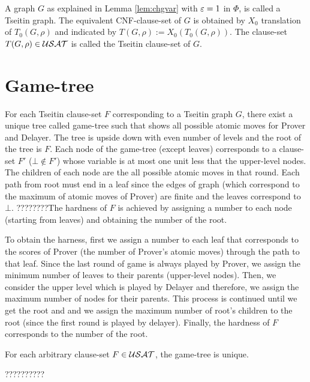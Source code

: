 \documentclass{report}
\begin{document}
A graph $G$ as explained in Lemma \ref{lem:chgvar} with $\varepsilon=1$ in $\Phi$, is called a Tseitin graph. The equivalent CNF-clause-set of $G$ is obtained by $X_0$ translation of $T_0(G,\rho)$ and indicated by $T(G,\rho) := X_0(T_0(G,\rho))$. The clause-set $T(G,\rho) \in \mathcal{USAT}$ is called the Tseitin clause-set of $G$.
\section{Game-tree}
\label{sec:Game-tree}

For each Tseitin clause-set $F$ corresponding to a Tseitin graph $G$, there exist a unique tree called game-tree such that shows all possible atomic moves for Prover and Delayer. The tree is upside down with even number of levels and the root of the tree is $F$. Each node of the game-tree (except leaves) corresponds to a clause-set $F'$ ($ \bot \not \in F'$) whose variable is at most one unit less that the upper-level nodes. The children of each node are the all possible atomic moves in that round. Each path from root must end in a leaf since the edges of graph (which correspond to the maximum of atomic moves of Prover) are finite and the leaves correspond to $\bot$. ????????The hardness of $F$ is achieved by assigning a number to each node (starting from leaves) and obtaining the number of the root.

To obtain the harness, first we assign a number to each leaf that corresponds to the scores of Prover (the number of Prover's atomic moves) through the path to that leaf. Since the last round of game is always played by Prover, we assign the minimum number of leaves to their parents (upper-level nodes). Then, we consider the upper level which is played by Delayer and therefore, we assign the maximum number of nodes for their parents. This process is continued until we get the root and and we assign the maximum number of root's children to the root (since the first round is played by delayer). Finally, the hardness of $F$ corresponds to the number of the root.

\begin{lem}\label{lem:game2}
For each arbitrary clause-set $F \in \mathcal{USAT}$, the game-tree is unique.
\end{lem}
\begin{prf}
??????????
\end{prf}
\end{document}

